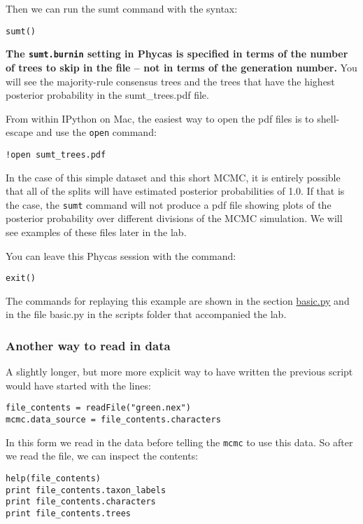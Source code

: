 \documentclass{article}
\newcommand{\cmd}[1]{\texttt{#1}\xspace}
\newcommand{\phycas}{Phycas\xspace}
\newcommand{\localfile}[1]{\textsf{#1}\xspace}
\begin{document}
Then we can run the sumt command with the syntax:
\begin{verbatim}
sumt()
\end{verbatim}
\textbf{The \cmd{sumt.burnin} setting in \phycas is specified in terms of the number of trees to skip in the file -- not in terms of the generation number.}
You will see the majority-rule consensus trees and the trees that have the 
highest posterior probability in the \localfile{sumt\_trees.pdf} file.

From within IPython on Mac, the easiest way to open the pdf files is to shell-escape and use the \cmd{open} command:
\begin{verbatim}
!open sumt_trees.pdf
\end{verbatim}


In the case of this simple dataset and this short MCMC, it is entirely possible that all of the 
splits will have estimated posterior probabilities of 1.0.
If that is the case, the \cmd{sumt} command will not produce a pdf file showing 
plots of the posterior probability over different divisions of the MCMC
simulation.
We will see examples of these files later in the lab.

You can leave this \phycas session with the command:
\begin{verbatim}
exit()
\end{verbatim}
The commands for replaying this example are shown in the section \hyperref[basicpy]{basic.py} and in the file \localfile{basic.py} in the scripts folder that accompanied the lab.

\subsubsection{Another way to read in data}
A slightly longer, but more more explicit way to have written the previous 
script would have started with the lines:
\begin{verbatim}
file_contents = readFile("green.nex")
mcmc.data_source = file_contents.characters
\end{verbatim}

In this form we read in the data before telling the \cmd{mcmc} to use this data.
So after we read the file, we can inspect the contents:
\begin{verbatim}
help(file_contents)
print file_contents.taxon_labels
print file_contents.characters
print file_contents.trees
\end{verbatim}
\end{document}
